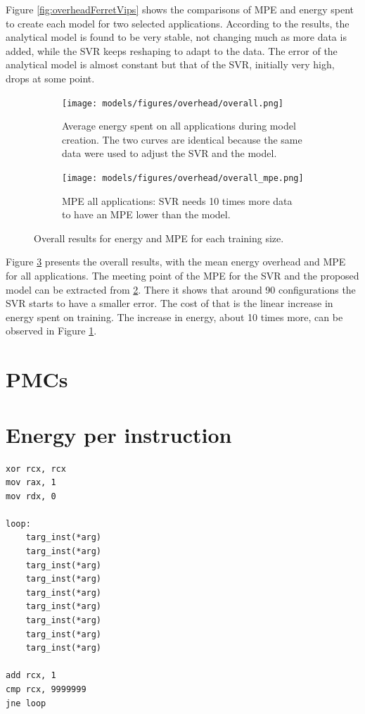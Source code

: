 Figure \ref{fig:overheadFerretVips} shows the comparisons of MPE and energy spent to create each model for two selected applications. According to the results, the analytical model is found to be very stable, not changing much as more data is added, while the SVR keeps reshaping to adapt to the data. 
The error of the analytical model is almost constant but that of  the SVR, initially very high, drops at some point.
\begin{figure}[H]
	\centering
	\begin{subfigure}[b]{0.44\textwidth}
		\centerline{\texttt{[image: models/figures/overhead/overall.png]}}
		\caption{Average energy spent on all applications during model creation. The two curves are identical because the same data were used to adjust the SVR and the model.}
		\label{fig:overall_overhead}
	\end{subfigure}
	\quad
	\begin{subfigure}[b]{0.44\textwidth}
		\centerline{\texttt{[image: models/figures/overhead/overall\_mpe.png]}}
		\caption{
			MPE all applications: SVR needs 10 times more data to have an MPE lower than the model.}
		\label{fig:overall_MPE}
	\end{subfigure}
	\caption{Overall results for energy and MPE for each training size.}
	\label{fig:overall_train}
\end{figure}
Figure \ref{fig:overall_train} presents the overall results, with the mean energy overhead and MPE for all applications.
The meeting point of the MPE for the SVR and the proposed model can be extracted from  \ref{fig:overall_MPE}.
There it shows that around 90 configurations the SVR starts to have a smaller error. The cost of that is the linear increase in energy spent on training. The increase in energy, about 10 times more, can be observed in Figure \ref{fig:overall_overhead}.


\section{PMCs}


\section{Energy per instruction}

\begin{lstlisting}
xor rcx, rcx
mov rax, 1
mov rdx, 0

loop:
	targ_inst(*arg)
	targ_inst(*arg)
	targ_inst(*arg)
	targ_inst(*arg)
	targ_inst(*arg)
	targ_inst(*arg)
	targ_inst(*arg)
	targ_inst(*arg)
	targ_inst(*arg)

add rcx, 1
cmp rcx, 9999999
jne loop
\end{lstlisting}

